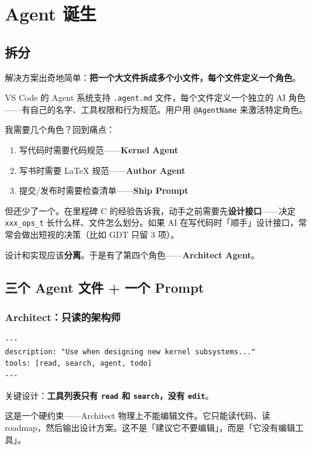 \chapter{Agent 诞生}

\section{拆分}

解决方案出奇地简单：\textbf{把一个大文件拆成多个小文件，每个文件定义一个角色}。

VS Code 的 Agent 系统支持 \texttt{.agent.md} 文件，每个文件定义一个独立的 AI 角色——有自己的名字、工具权限和行为规范。用户用 \texttt{@AgentName} 来激活特定角色。

我需要几个角色？回到痛点：

\begin{enumerate}
  \item 写代码时需要代码规范——\textbf{Kernel Agent}
  \item 写书时需要 LaTeX 规范——\textbf{Author Agent}
  \item 提交/发布时需要检查清单——\textbf{Ship Prompt}
\end{enumerate}

但还少了一个。在里程碑 C 的经验告诉我，动手之前需要先\textbf{设计接口}——决定 \texttt{xxx\_ops\_t} 长什么样、文件怎么划分。如果 AI 在写代码时「顺手」设计接口，常常会做出短视的决策（比如 GDT 只留 3 项）。

设计和实现应该\textbf{分离}。于是有了第四个角色——\textbf{Architect Agent}。

\section{三个 Agent 文件 + 一个 Prompt}

\subsection{Architect：只读的架构师}

\begin{lstlisting}[style=yamlstyle]
---
description: "Use when designing new kernel subsystems..."
tools: [read, search, agent, todo]
---
\end{lstlisting}

关键设计：\textbf{工具列表只有 \texttt{read} 和 \texttt{search}，没有 \texttt{edit}}。

这是一个硬约束——Architect 物理上不能编辑文件。它只能读代码、读 roadmap，然后输出设计方案。这不是「建议它不要编辑」，而是「它没有编辑工具」。

